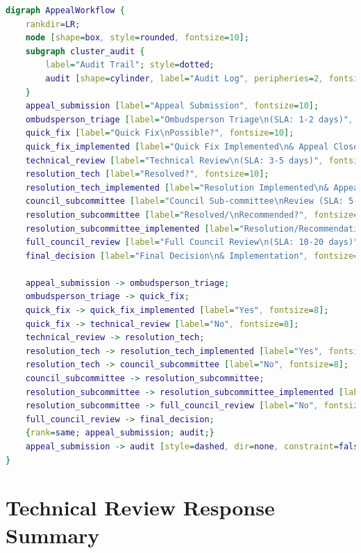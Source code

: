 \documentclass[sigconf,natbib]{acmart}
\begin{document}
\begin{lstlisting}[language=DOT, caption={Complete DOT language specification for the Appeal and Dispute Resolution Workflow. Compile using Graphviz to generate the flowchart shown in \Cref{fig:appeal_workflow}.}, label=lst:appeal_workflow_dot_appendix, basicstyle=\ttfamily\scriptsize, numbers=none]
digraph AppealWorkflow {
    rankdir=LR;
    node [shape=box, style=rounded, fontsize=10];
    subgraph cluster_audit {
        label="Audit Trail"; style=dotted;
        audit [shape=cylinder, label="Audit Log", peripheries=2, fontsize=10];
    }
    appeal_submission [label="Appeal Submission", fontsize=10];
    ombudsperson_triage [label="Ombudsperson Triage\n(SLA: 1-2 days)", fontsize=10];
    quick_fix [label="Quick Fix\nPossible?", fontsize=10];
    quick_fix_implemented [label="Quick Fix Implemented\n& Appeal Closed", fontsize=10];
    technical_review [label="Technical Review\n(SLA: 3-5 days)", fontsize=10];
    resolution_tech [label="Resolved?", fontsize=10];
    resolution_tech_implemented [label="Resolution Implemented\n& Appeal Closed", fontsize=10];
    council_subcommittee [label="Council Sub-committee\nReview (SLA: 5-10 days)", fontsize=10];
    resolution_subcommittee [label="Resolved/\nRecommended?", fontsize=10];
    resolution_subcommittee_implemented [label="Resolution/Recommendation\nImplemented & Appeal Closed", fontsize=10];
    full_council_review [label="Full Council Review\n(SLA: 10-20 days)", fontsize=10];
    final_decision [label="Final Decision\n& Implementation", fontsize=10];

    appeal_submission -> ombudsperson_triage;
    ombudsperson_triage -> quick_fix;
    quick_fix -> quick_fix_implemented [label="Yes", fontsize=8];
    quick_fix -> technical_review [label="No", fontsize=8];
    technical_review -> resolution_tech;
    resolution_tech -> resolution_tech_implemented [label="Yes", fontsize=8];
    resolution_tech -> council_subcommittee [label="No", fontsize=8];
    council_subcommittee -> resolution_subcommittee;
    resolution_subcommittee -> resolution_subcommittee_implemented [label="Yes", fontsize=8];
    resolution_subcommittee -> full_council_review [label="No", fontsize=8];
    full_council_review -> final_decision;
    {rank=same; appeal_submission; audit;}
    appeal_submission -> audit [style=dashed, dir=none, constraint=false];
}
\end{lstlisting}

\section{Technical Review Response Summary}
\label{app:technical_review_response}
\end{document}
